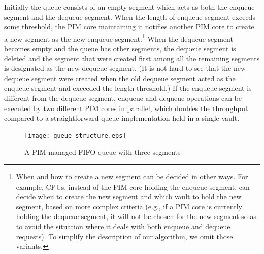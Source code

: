 Initially the queue consists of an empty segment which acts as both the enqueue segment and 
the dequeue segment. 
When the length of enqueue segment exceeds some threshold, the PIM core maintaining it
notifies another PIM core to create a new segment as the new enqueue segment.\footnote{
When and how to create a new segment can be decided in other ways.
For example, CPUs, instead of the PIM core holding the enqueue segment, 
can decide when to create the new segment and which vault to hold the new segment, 
based on more complex criteria 
(e.g., if a PIM core is currently holding the dequeue segment, it will not be chosen for 
the new segment so as to avoid the situation where it deals with both enqueue and dequeue requests).
To simplify the description of our algorithm, we omit those variants.}
When the dequeue segment becomes empty and the queue has other segments, 
the dequeue segment is deleted and the segment that were created first 
among all the remaining segments is designated as the new dequeue segment. 
(It is not hard to see that the new dequeue segment were created when the old dequeue segment 
acted as the enqueue segment and exceeded the length threshold.)
If the enqueue segment is different from the dequeue segment, 
enqueue and dequeue operations can be executed by two different PIM cores 
in parallel, which doubles the throughput compared to a straightforward queue implementation 
held in a single vault.  

\begin{figure}[ht!]
\centering
\texttt{[image: queue\_structure.eps]}
\caption{A PIM-managed FIFO queue with three segments}
\label{figure:queue_structure}
\end{figure}


